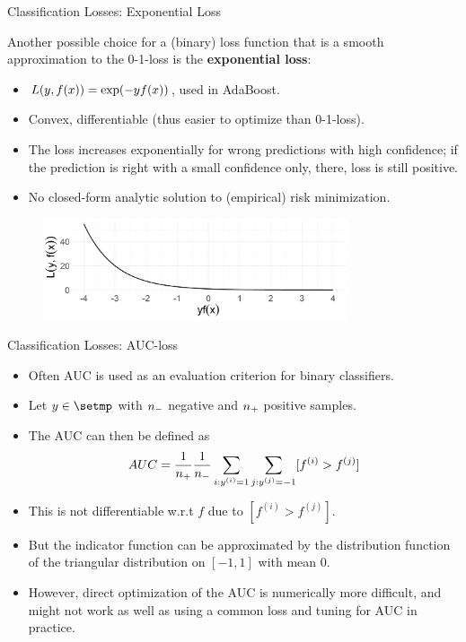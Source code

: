 \begin{vbframe}{Classification Losses: Exponential Loss}

Another possible choice for a (binary) loss function that is a smooth 
approximation to the 0-1-loss is the \textbf{exponential loss}:
\begin{itemize}
\item $\Lxy = \exp(-y\fx)$, used in AdaBoost.
\item Convex, differentiable (thus easier to optimize than 0-1-loss).
\item The loss increases exponentially for wrong predictions with high confidence; if the prediction is right with a small confidence only, there, loss is still positive.
\item No closed-form analytic solution to (empirical) risk minimization.
\end{itemize}


\begin{figure}
\includegraphics[width = 0.8\textwidth]{figure/plot_loss_exponential.png}
\end{figure}

\end{vbframe}

\begin{vbframe}{Classification Losses: AUC-loss}

\begin{itemize}
\item Often AUC is used as an evaluation criterion for binary classifiers.
\item Let $y \in \setmp$ with $\nn$ negative and $\np$ positive samples. %
\item The AUC can then be defined as
$$AUC = \frac{1}{\np} \frac{1}{\nn} \sum_{i: \yi = 1} \sum_{j: \yi[j] = -1} [f^{(i)} > f^{(j)}]$$
\item This is not differentiable w.r.t $f$ due to $[f^{(i)} > f^{(j)}]$.
\item But the indicator function can be approximated by the distribution function of the triangular distribution on $[-1, 1]$ with mean $0$.
\item However, direct optimization of the AUC is numerically more difficult, and might not work as well as using 
    a common loss and tuning for AUC in practice.

\end{itemize}
\end{vbframe}





\endlecture


